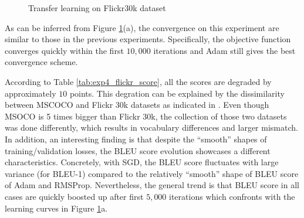 \begin{itemize}
\begin{figure}[ht]
	\centering
	\caption{Transfer learning on Flickr30k dataset}
	\label{fig:exp_4} %
\end{figure}

As can be inferred from Figure \ref{fig:exp_4}(a), the convergence on this experiment are similar to those in the previous experiments. Specifically, the objective function converges quickly within the first $10,000$ iterations and Adam still gives the best convergence scheme. 

According to Table \ref{tab:exp4_flickr_score}, all the scores are degraded by approximately $10$ points. This degration can be explained by the dissimilarity between MSCOCO and Flickr 30k datasets as indicated in \cite{DBLP:journals/corr/YosinskiCBL14}. Even though MSOCO is 5 times bigger than Flickr 30k, the collection of those two datasets was done differently, which results in vocabulary differences and larger mismatch. In addition, an interesting finding is that despite the ``smooth'' shapes of training/validation losses, the BLEU score evolution showcases a different characteristics. Concretely, with SGD, the BLEU score fluctuates with large variance (for BLEU-1) compared to the relatively ``smooth'' shape of BLEU score of Adam and RMSProp. Nevertheless, the general trend is that BLEU score in all cases are quickly boosted up after first $5,000$ iterations which confronts with the learning curves in Figure \ref{fig:exp_4}a.


\end{itemize}
